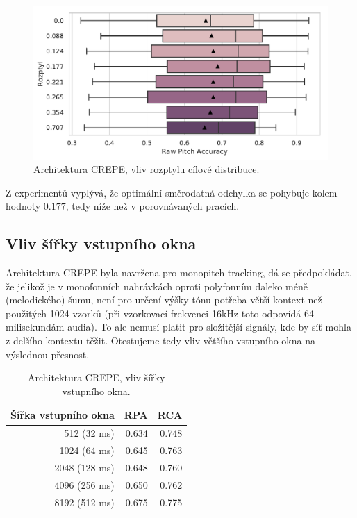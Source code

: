 \begin{figure}[h]\centering
    \includegraphics[scale=0.6]{../img/figures/crepe_rozptyl.pdf}
\caption{Architektura CREPE, vliv rozptylu cílové distribuce.}\label{obr:crepe_diskretizace}
\end{figure}



Z experimentů vyplývá, že optimální směrodatná odchylka se pohybuje kolem hodnoty $0.177$, tedy níže než v porovnávaných pracích. 


\subsection{Vliv šířky vstupního okna}

Architektura CREPE byla navržena pro monopitch tracking, dá se předpokládat, že jelikož je v monofonních nahrávkách oproti polyfonním daleko méně (melodického) šumu, není pro určení výšky tónu potřeba větší kontext než použitých 1024 vzorků (při vzorkovací frekvenci 16kHz toto odpovídá 64 milisekundám audia). To ale nemusí platit pro složitější signály, kde by síť mohla z delšího kontextu těžit. Otestujeme tedy vliv většího vstupního okna na výslednou přesnost.


\begin{table}[h!]
\centering
    \begin{tabular}{rrr}
    \toprule
    Šířka vstupního okna &   RPA &   RCA \\
    \midrule
    512 (32 ms)   & 0.634 & 0.748 \\
    1024 (64 ms)  & 0.645 & 0.763 \\
    2048 (128 ms) & 0.648 & 0.760 \\
    4096 (256 ms) & 0.650 & 0.762 \\
    8192 (512 ms) & 0.675 & 0.775 \\
    \bottomrule
    \end{tabular}

\caption{Architektura CREPE, vliv šířky vstupního okna.}\label{tab:crepe_sirka}
\end{table}

